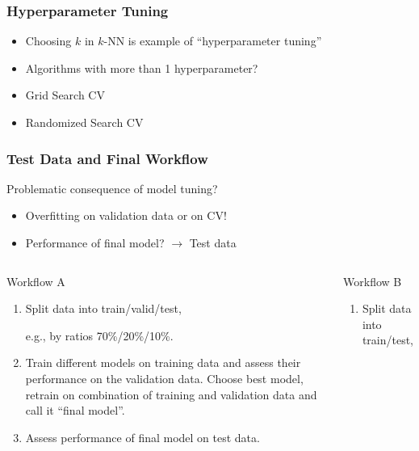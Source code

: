 \documentclass[
    utf8,
    aspectratio=169
]{beamer}  %
\begin{document}
\begin{frame}
	\frametitle{Hyperparameter Tuning}
	\begin{itemize}
		\item Choosing $k$ in $k$-NN is example of \alert{``hyperparameter tuning''}
		\item Algorithms with more than 1 hyperparameter?
		\item Grid Search CV
		\item Randomized Search CV
	\end{itemize}
\end{frame}

\begin{frame}
	\frametitle{Test Data and Final Workflow}
	
	\begin{block}{Problematic consequence of model tuning?}
		\begin{itemize}
			\item \alert{Overfitting} on validation data or on CV!
			\item Performance of final model? $\rightarrow$ \alert{Test data}
		\end{itemize}
	\end{block}
	
	\begin{columns}[onlytextwidth]
		\begin{block}{Workflow A}
			\begin{footnotesize}
				\begin{enumerate}
					\item Split data into train/valid/test, 
					
					e.g., by ratios 70\%/20\%/10\%.
					\item Train different models on training data and assess their performance on the validation data. Choose best model, retrain on combination of training and validation data and call it ``final model''.
					\item Assess performance of final model on test data.
				\end{enumerate}
			\end{footnotesize}
		\end{block}
		
		\begin{block}{Workflow B}
			\begin{footnotesize}
				\begin{enumerate}
					\item Split data into train/test, 
					

\end{enumerate}
\end{footnotesize}
\end{block}
\end{columns}
\end{frame}
\end{document}
